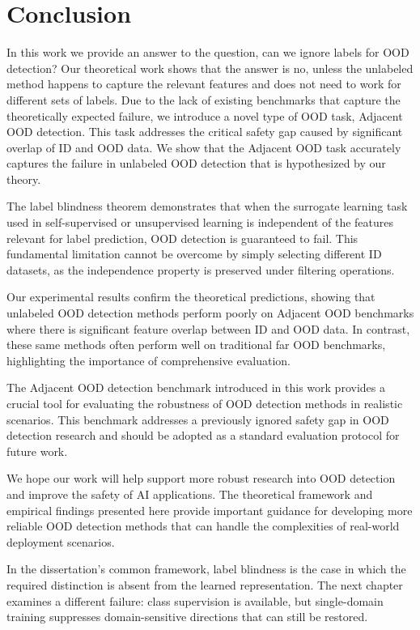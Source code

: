 \section{Conclusion}

In this work we provide an answer to the question, can we ignore labels for OOD detection? Our theoretical work shows that the answer is no, unless the unlabeled method happens to capture the relevant features and does not need to work for different sets of labels. Due to the lack of existing benchmarks that capture the theoretically expected failure, we introduce a novel type of OOD task, Adjacent OOD detection. This task addresses the critical safety gap caused by significant overlap of ID and OOD data. We show that the Adjacent OOD task accurately captures the failure in unlabeled OOD detection that is hypothesized by our theory.

The label blindness theorem demonstrates that when the surrogate learning task used in self-supervised or unsupervised learning is independent of the features relevant for label prediction, OOD detection is guaranteed to fail. This fundamental limitation cannot be overcome by simply selecting different ID datasets, as the independence property is preserved under filtering operations.

Our experimental results confirm the theoretical predictions, showing that unlabeled OOD detection methods perform poorly on Adjacent OOD benchmarks where there is significant feature overlap between ID and OOD data. In contrast, these same methods often perform well on traditional far OOD benchmarks, highlighting the importance of comprehensive evaluation.

The Adjacent OOD detection benchmark introduced in this work provides a crucial tool for evaluating the robustness of OOD detection methods in realistic scenarios. This benchmark addresses a previously ignored safety gap in OOD detection research and should be adopted as a standard evaluation protocol for future work.

We hope our work will help support more robust research into OOD detection and improve the safety of AI applications. The theoretical framework and empirical findings presented here provide important guidance for developing more reliable OOD detection methods that can handle the complexities of real-world deployment scenarios.

In the dissertation's common framework, label blindness is the case in which the
required distinction is absent from the learned representation. The next chapter
examines a different failure: class supervision is available, but single-domain
training suppresses domain-sensitive directions that can still be restored.
